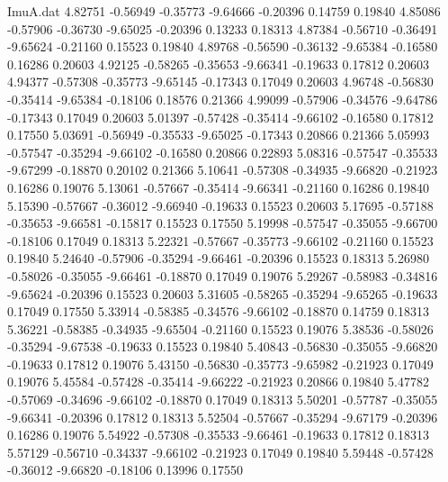 \begin{filecontents}{ImuA.dat}
   4.82751   -0.56949   -0.35773   -9.64666   -0.20396    0.14759    0.19840
   4.85086   -0.57906   -0.36730   -9.65025   -0.20396    0.13233    0.18313
   4.87384   -0.56710   -0.36491   -9.65624   -0.21160    0.15523    0.19840
   4.89768   -0.56590   -0.36132   -9.65384   -0.16580    0.16286    0.20603
   4.92125   -0.58265   -0.35653   -9.66341   -0.19633    0.17812    0.20603
   4.94377   -0.57308   -0.35773   -9.65145   -0.17343    0.17049    0.20603
   4.96748   -0.56830   -0.35414   -9.65384   -0.18106    0.18576    0.21366
   4.99099   -0.57906   -0.34576   -9.64786   -0.17343    0.17049    0.20603
   5.01397   -0.57428   -0.35414   -9.66102   -0.16580    0.17812    0.17550
   5.03691   -0.56949   -0.35533   -9.65025   -0.17343    0.20866    0.21366
   5.05993   -0.57547   -0.35294   -9.66102   -0.16580    0.20866    0.22893
   5.08316   -0.57547   -0.35533   -9.67299   -0.18870    0.20102    0.21366
   5.10641   -0.57308   -0.34935   -9.66820   -0.21923    0.16286    0.19076
   5.13061   -0.57667   -0.35414   -9.66341   -0.21160    0.16286    0.19840
   5.15390   -0.57667   -0.36012   -9.66940   -0.19633    0.15523    0.20603
   5.17695   -0.57188   -0.35653   -9.66581   -0.15817    0.15523    0.17550
   5.19998   -0.57547   -0.35055   -9.66700   -0.18106    0.17049    0.18313
   5.22321   -0.57667   -0.35773   -9.66102   -0.21160    0.15523    0.19840
   5.24640   -0.57906   -0.35294   -9.66461   -0.20396    0.15523    0.18313
   5.26980   -0.58026   -0.35055   -9.66461   -0.18870    0.17049    0.19076
   5.29267   -0.58983   -0.34816   -9.65624   -0.20396    0.15523    0.20603
   5.31605   -0.58265   -0.35294   -9.65265   -0.19633    0.17049    0.17550
   5.33914   -0.58385   -0.34576   -9.66102   -0.18870    0.14759    0.18313
   5.36221   -0.58385   -0.34935   -9.65504   -0.21160    0.15523    0.19076
   5.38536   -0.58026   -0.35294   -9.67538   -0.19633    0.15523    0.19840
   5.40843   -0.56830   -0.35055   -9.66820   -0.19633    0.17812    0.19076
   5.43150   -0.56830   -0.35773   -9.65982   -0.21923    0.17049    0.19076
   5.45584   -0.57428   -0.35414   -9.66222   -0.21923    0.20866    0.19840
   5.47782   -0.57069   -0.34696   -9.66102   -0.18870    0.17049    0.18313
   5.50201   -0.57787   -0.35055   -9.66341   -0.20396    0.17812    0.18313
   5.52504   -0.57667   -0.35294   -9.67179   -0.20396    0.16286    0.19076
   5.54922   -0.57308   -0.35533   -9.66461   -0.19633    0.17812    0.18313
   5.57129   -0.56710   -0.34337   -9.66102   -0.21923    0.17049    0.19840
   5.59448   -0.57428   -0.36012   -9.66820   -0.18106    0.13996    0.17550

\end{filecontents}
